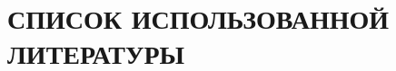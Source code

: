 \section{СПИСОК ИСПОЛЬЗОВАННОЙ ЛИТЕРАТУРЫ}

\begingroup
\renewcommand{\section}[2]{}%
\newcommand{\printupdate}{}

\printbibliography

\endgroup
\clearpage